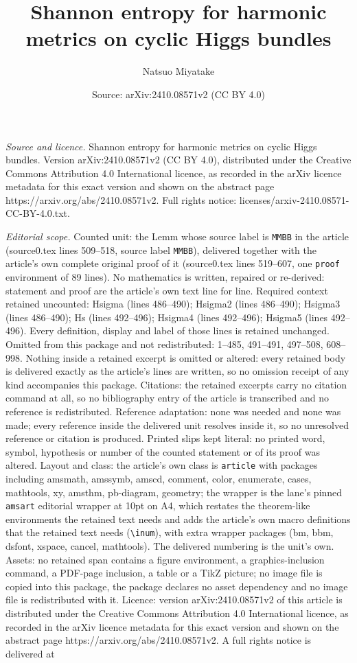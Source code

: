 \documentclass[10pt,a4paper]{amsart}
\title[Shannon entropy for harmonic metrics on cyclic Higgs bundles]{Shannon entropy for harmonic metrics on cyclic Higgs bundles}
\author{Natsuo Miyatake}
\date{Source: arXiv:2410.08571v2 (CC BY 4.0)}
\begin{document}
\maketitle

\noindent\emph{Source and licence.} Shannon entropy for harmonic metrics on cyclic Higgs bundles. Version arXiv:2410.08571v2 (CC BY 4.0), distributed under the Creative Commons Attribution 4.0 International licence, as recorded in the arXiv licence metadata for this exact version and shown on the abstract page https://arxiv.org/abs/2410.08571v2. Full rights notice: licenses/arxiv-2410.08571-CC-BY-4.0.txt.\par\smallskip

\noindent\textit{Editorial scope.} Counted unit: the Lemm whose source label is \texttt{MMBB} in the article (source0.tex lines 509--518, source label \texttt{MMBB}), delivered together with the article's own complete original proof of it (source0.tex lines 519--607, one \texttt{proof} environment of 89 lines). No mathematics is written, repaired or re-derived: statement and proof are the article's own text line for line. Required context retained uncounted: Hsigma (lines 486--490); Hsigma2 (lines 486--490); Hsigma3 (lines 486--490); Hs (lines 492--496); Hsigma4 (lines 492--496); Hsigma5 (lines 492--496). Every definition, display and label of those lines is retained unchanged. Omitted from this package and not redistributed: 1--485, 491--491, 497--508, 608--998. Nothing inside a retained excerpt is omitted or altered: every retained body is delivered exactly as the article's lines are written, so no omission receipt of any kind accompanies this package. Citations: the retained excerpts carry no citation command at all, so no bibliography entry of the article is transcribed and no reference is redistributed. Reference adaptation: none was needed and none was made; every reference inside the delivered unit resolves inside it, so no unresolved reference or citation is produced. Printed slips kept literal: no printed word, symbol, hypothesis or number of the counted statement or of its proof was altered. Layout and class: the article's own class is \texttt{article} with packages including amsmath, amssymb, amscd, comment, color, enumerate, cases, mathtools, xy, amsthm, pb-diagram, geometry; the wrapper is the lane's pinned \texttt{amsart} editorial wrapper at 10pt on A4, which restates the theorem-like environments the retained text needs and adds the article's own macro definitions that the retained text needs (\texttt{\textbackslash inum}), with extra wrapper packages (bm, bbm, dsfont, xspace, cancel, mathtools). The delivered numbering is the unit's own. Assets: no retained span contains a figure environment, a graphics-inclusion command, a PDF-page inclusion, a table or a TikZ picture; no image file is copied into this package, the package declares no asset dependency and no image file is redistributed with it. Licence: version arXiv:2410.08571v2 of this article is distributed under the Creative Commons Attribution 4.0 International licence, as recorded in the arXiv licence metadata for this exact version and shown on the abstract page https://arxiv.org/abs/2410.08571v2. A full rights notice is delivered at 
\end{document}
